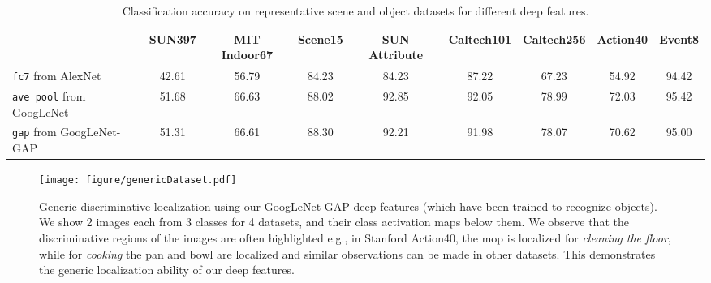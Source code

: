 \documentclass[10pt,twocolumn,letterpaper]{article}
\begin{document}
\begin{table*}\caption{Classification accuracy on representative scene and object datasets for different deep features. }\label{dataset_comparison}
\centering
\footnotesize
\begin{tabular}{lcccccccc}
\hline
\hline
 &SUN397&MIT Indoor67&Scene15&SUN Attribute&Caltech101&Caltech256&Action40 & Event8 \\
\hline
\texttt{fc7} from AlexNet       & 42.61 & 56.79 & 84.23 & 84.23 & 87.22 & 67.23 & 54.92 & 94.42 \\
\texttt{ave pool} from GoogLeNet     & 51.68 & 66.63 & 88.02 & 92.85 & 92.05  & 78.99    & 72.03 & 95.42\\
\texttt{gap} from GoogLeNet-GAP  & 51.31 & 66.61 & 88.30 & 92.21 & 91.98  & 78.07    & 70.62 & 95.00\\
\hline
\end{tabular}
\label{tableResultsDeepSceneFeat}
\end{table*}

\begin{figure*}
\begin{center}
\texttt{[image: figure/genericDataset.pdf]}
\end{center}
\vspace*{-4mm}
\caption{Generic discriminative localization using our GoogLeNet-GAP deep features (which have been trained to recognize objects). We show 2 images each from 3 classes for 4 datasets, and their class activation maps below them. We observe that the discriminative regions of the images are often highlighted e.g., in Stanford Action40, the mop is localized for \textit{cleaning the floor}, while for \textit{cooking} the pan and bowl are localized and similar observations can be made in other datasets. This demonstrates the generic localization ability of our deep features.}
\label{fig:genericlocalization}
\end{figure*}

\end{document}
